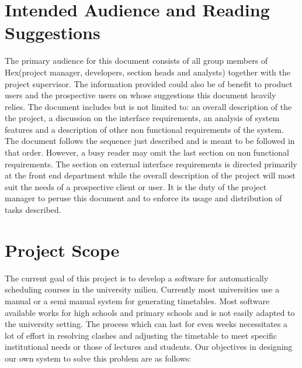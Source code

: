 \documentclass{scrreprt}
\begin{document}
\section{Intended Audience and Reading Suggestions}
 The primary audience for this document consists of all group members of Hex(project manager, developers, section heads and analysts) together with the project supervisor. The information provided could also be of benefit to product users and the prospective users on whose suggestions this document heavily relies. The document includes but is not limited to: an overall description of the the project, a discussion on the interface requirements, an analysis of system features and a description of other non functional requirements of the system. The document follows the sequence just described and is meant to be followed in that order. However, a busy reader may omit the last section on non functional requirements. The section on external interface requirements is directed primarily at the front end department while the overall description of the project will most suit the needs of a prospective client or user. It is the duty of the project manager to peruse this document and to enforce its usage and distribution of tasks described.

\section{Project Scope}
 The  current goal of this project is to develop a software for automatically scheduling courses in the university milieu. Currently most universities use a manual or a semi manual system for generating timetables. Most software available works for high schools and primary schools and is not easily adapted to the university setting. The process which can last for even weeks necessitates a lot of effort in resolving clashes and adjusting the timetable to meet specific institutional needs or those of lectures and students. Our objectives in designing our own system to solve this problem are as follows:
\end{document}

